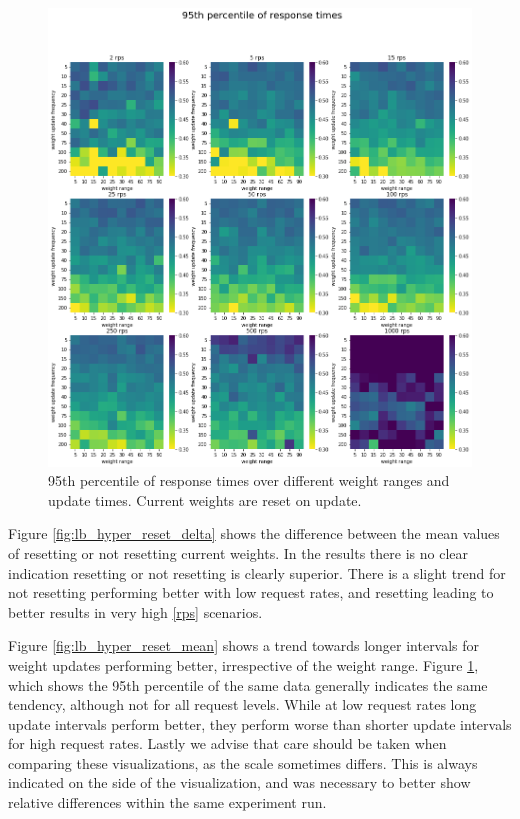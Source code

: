 \begin{figure}
    \centering
    \includegraphics[width=14cm]{graphics/graphs/lb_hyper_95th_percentile_with_reset.png}
    \caption{95th percentile of response times over different weight ranges and update times. Current weights are reset on update.}
    \label{fig:lb_hyper_reset_q95}
\end{figure}

Figure \ref{fig:lb_hyper_reset_delta} shows the difference between the mean values of resetting or not resetting current weights.
In the results there is no clear indication resetting or not resetting is clearly superior.
There is a slight trend for not resetting performing better with low request rates, and resetting leading to better results in very high \ref{rps} scenarios.

Figure \ref{fig:lb_hyper_reset_mean} shows a trend towards longer intervals for weight updates performing better, irrespective of the weight range.
Figure \ref{fig:lb_hyper_reset_q95}, which shows the 95th percentile of the same data generally indicates the same tendency, although not for all request levels.
While at low request rates long update intervals perform better, they perform worse than shorter update intervals for high request rates.
Lastly we advise that care should be taken when comparing these visualizations, as the scale sometimes differs.
This is always indicated on the side of the visualization, and was necessary to better show relative differences within the same experiment run.


